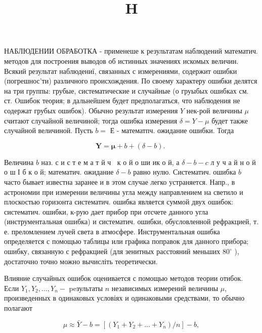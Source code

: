 \documentclass[10pt]{article}
\title{$\mathbf{H}$ }
\author{}
\date{}
\begin{document}
\maketitle

НАБЛЮДЕНИИ ОБРАБОТКА - применеше к результатам наблюдений математич. методов для построения выводов об истинных значениях искомых величин. Всякий результат наблюдениї, связанных с измерениями, содержит ошибки (погрешнос'ти) различного происхождения. По своему характеру ошибки делятся на три группы: грубые, систематические и случайные (о груыбых ошибках см. ст. Oшибок теория; в дальнейшем будет предполагаться, что наблюдения не содержат грубых ошибок). Обычно результат измерения $Y$ нек-рой величины $\mu$ считают случайной величиной; тогда ошибка измерения $\delta=Y-\mu$ будет также случайной величиной. Пусть $b=$ Е - математпч. ожидание ошибки. Тогда



\[

\boldsymbol{Y}=\boldsymbol{\mu}+b+(\delta-b) \text {. }

\]



Величина $b$ наз. с и с т е м а т й ч $\mathbf{~}$ к о й $о$ ши ик о й, а $\delta-b-c$ л у ч а й н о й $о$ ш І б к о й; математич. ожидание $\delta-b$ равно нулю. Систематич. ошибка $b$ часто бывает известна заранее и в этом случае легко устраняется. Напр., в астрономии при измерении величины угла между направлением на светило и плоскостью горизонта систематич. ошибка является суммой двух ошибок: систематич. ошибки, к-рую дает прибор при отсчете данного угла (инструментальная ошибка) и систематич. ошибки, обусловленной рефракцией, т. е. преломлением лучей света в атмосфере. Инструментальная ошибка определяется с помощью таблицы или графика поправок для данного прибора; ошибку, связанную с рефракцией (для зенитных расстояний меньших $80^{\circ}$ ), достаточно точно можно вычисліть теоретически.



Влияние случайных ошибок оценивается с помощью методов теории отибок. Если $Y_{1}, Y_{2}, \ldots, Y_{n}-$ peзультаты $n$ независимых измерений величины $\mu$, произведенных в одинаковых условіях и одинаковыми средствами, то обычно полагают



\[

\mu \approx \bar{Y}-b=\left[\left(Y_{1}+Y_{2}+\ldots+Y_{n}\right) / n\right]-b,

\]
\end{document}
